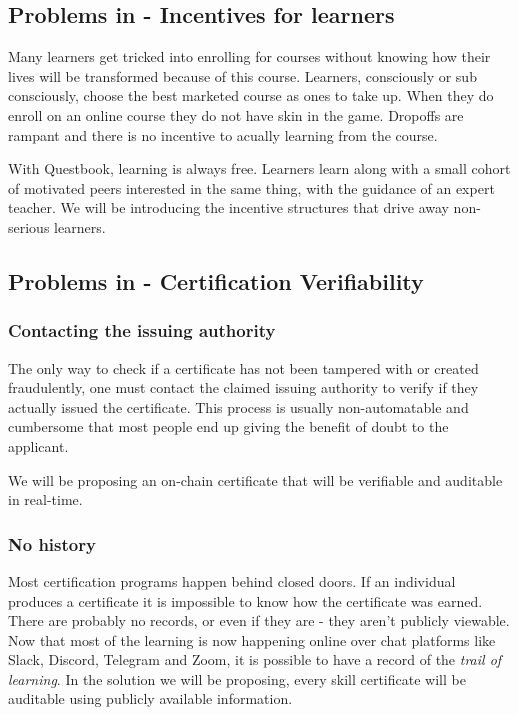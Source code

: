 \documentclass{article}
\begin{document}
    \subsection{Problems in - Incentives for learners}
      Many learners get tricked into enrolling for courses without knowing how their lives will be transformed because of this course.
      Learners, consciously or sub consciously, choose the best marketed course as ones to take up. 
      When they do enroll on an online course they do not have skin in the game. 
      Dropoffs are rampant and there is no incentive to acually learning from the course.
      \par
      With Questbook, learning is always free. 
      Learners learn along with a small cohort of motivated peers interested in the same thing, with the guidance of an expert teacher.
      We will be introducing the incentive structures that drive away non-serious learners.
    \subsection{Problems in - Certification Verifiability}
      \subsubsection{Contacting the issuing authority}
        The only way to check if a certificate has not been tampered with or created fraudulently, one must contact the claimed issuing authority to verify if they actually issued the certificate. 
        This process is usually non-automatable and cumbersome that most people end up giving the benefit of doubt to the applicant. 
        \par
        We will be proposing an on-chain certificate that will be verifiable and auditable in real-time.
      \subsubsection{No history}
        Most certification programs happen behind closed doors. If an individual produces a certificate it is impossible to know how the certificate was earned. There are probably no records, or even if they are - they aren't publicly viewable. 
        \break
        Now that most of the learning is now happening online over chat platforms like Slack, Discord, Telegram and Zoom, it is possible to have a record of the \textit{trail of learning}. In the solution we will be proposing, every skill certificate will be auditable using publicly available information.
\end{document}
